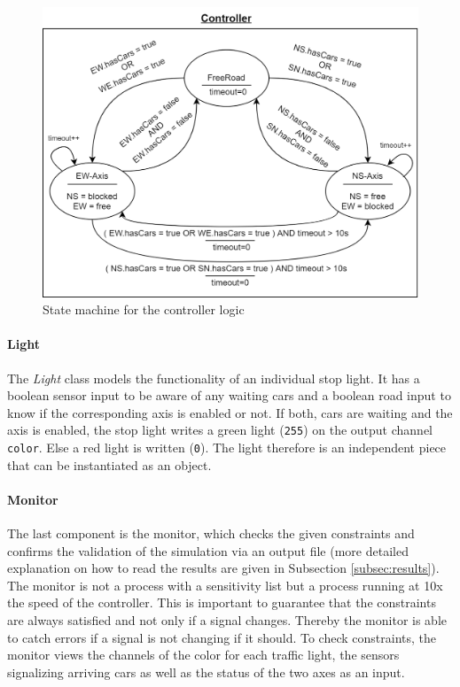 \documentclass[10pt,bibliography=totocnumbered,listof=totocnumbered, footsepline, headsepline]{scrreprt}
\begin{document}
    \begin{figure}[H]
    	\centerline{\includegraphics[width=34pc]{Controller_Diagram.drawio.png}}
    	\caption{State machine for the controller logic}
    	\label{fig:Controller_FlowChart}
    \end{figure}
    
    \paragraph*{Light} The \textit{Light} class models the functionality of an individual stop light.
    It has a boolean sensor input to be aware of any waiting cars and a boolean road input to know if the corresponding axis is enabled or not. If both, cars are waiting and the axis is enabled, the stop light writes a green light (\texttt{255}) on the output channel \texttt{color}. Else a red light is written (\texttt{0}).
    The light therefore is an independent piece that can be instantiated as an object.
    
    \paragraph*{Monitor} The last component is the monitor, which checks the given constraints and confirms the validation of the simulation via an output file (more detailed explanation on how to read the results are given in Subsection \ref{subsec:results}). The monitor is not a process with a sensitivity list but a process running at 10x the speed of the controller. This is important to guarantee that the constraints are always satisfied and not only if a signal changes. Thereby the monitor is able to catch errors if a signal is not changing if it should. To check constraints, the monitor views the channels of the color for each traffic light, the sensors signalizing arriving cars as well as the status of the two axes as an input.
    
\end{document}
